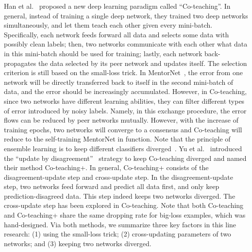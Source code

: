 Han et al.~ proposed a new deep learning paradigm called ``Co-teaching''. In general, instead of training a single deep network, they trained two deep networks simultaneously, and let them teach each other given every mini-batch. 
Specifically, each network feeds forward all data and selects some data with possibly clean labels; 
then, two networks communicate with each other what data in this mini-batch should be used for training; 
lastly, each network back-propagates the data selected by its peer network and updates itself. The selection criterion is still based on the small-loss trick.
In MentorNet~, the error from one network will be directly transferred back to itself in the second mini-batch of data, and the error should be increasingly accumulated. However, in Co-teaching, since two networks have different learning abilities, they can filter different types of error introduced by noisy labels. Namely, in this exchange procedure, the error flows can be reduced by peer networks mutually. However, with the increase of training epochs, two networks will converge to a consensus and Co-teaching will reduce to the self-training MentorNet in function. Note that the principle of ensemble learning is to keep different classifiers diverged~.
Yu et al.~ introduced the ``update by disagreement''~ strategy to keep Co-teaching diverged and named their method Co-teaching+. 
In general, Co-teaching+ consists of the disagreement-update step and cross-update step. In the disagreement-update step, two networks feed forward and predict all data first, and only keep prediction-disagreed data. This step indeed keeps two networks diverged. The cross-update step has been explored in Co-teaching. Note that both Co-teaching and Co-teaching+ share the same dropping rate for big-loss examples, which was hand-designed. Via both methods, we summarize three key factors in this line research: (1) using the small-loss trick; (2) cross-updating parameters of two networks; and (3) keeping two networks diverged.

